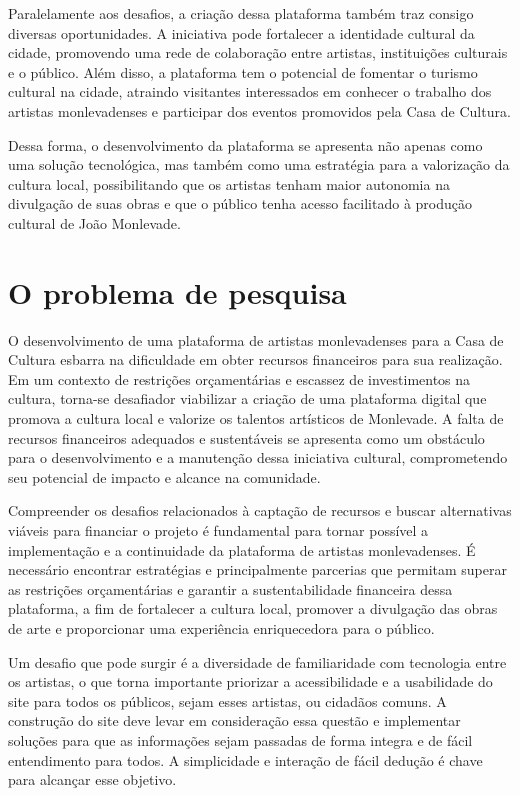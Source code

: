 Paralelamente aos desafios, a criação dessa plataforma também traz consigo diversas oportunidades. A iniciativa pode fortalecer a identidade cultural da cidade, promovendo uma rede de colaboração entre artistas, instituições culturais e o público. Além disso, a plataforma tem o potencial de fomentar o turismo cultural na cidade, atraindo visitantes interessados em conhecer o trabalho dos artistas monlevadenses e participar dos eventos promovidos pela Casa de Cultura.

Dessa forma, o desenvolvimento da plataforma se apresenta não apenas como uma solução tecnológica, mas também como uma estratégia para a valorização da cultura local, possibilitando que os artistas tenham maior autonomia na divulgação de suas obras e que o público tenha acesso facilitado à produção cultural de João Monlevade.

\section{O problema de pesquisa}
\label{sec:problema}

O desenvolvimento de uma plataforma de artistas monlevadenses para a Casa de Cultura esbarra na dificuldade em obter recursos financeiros para sua realização. Em um contexto de restrições orçamentárias e escassez de investimentos na cultura, torna-se desafiador viabilizar a criação de uma plataforma digital que promova a cultura local e valorize os talentos artísticos de Monlevade. A falta de recursos financeiros adequados e sustentáveis se apresenta como um obstáculo para o desenvolvimento e a manutenção dessa iniciativa cultural, comprometendo seu potencial de impacto e alcance na comunidade.

Compreender os desafios relacionados à captação de recursos e buscar alternativas viáveis para financiar o projeto é fundamental para tornar possível a implementação e a continuidade da plataforma de artistas monlevadenses. É necessário encontrar estratégias e principalmente parcerias que permitam superar as restrições orçamentárias e garantir a sustentabilidade financeira dessa plataforma, a fim de fortalecer a cultura local, promover a divulgação das obras de arte e proporcionar uma experiência enriquecedora para o público.

Um desafio que pode surgir é a diversidade de familiaridade com tecnologia entre os artistas, o que torna importante priorizar a acessibilidade e a usabilidade do site para todos os públicos, sejam esses artistas, ou cidadãos comuns. A construção do site deve levar em consideração essa questão e implementar soluções para que as informações sejam passadas de forma integra e de fácil entendimento para todos. A simplicidade e interação de fácil dedução é chave para alcançar esse objetivo.

